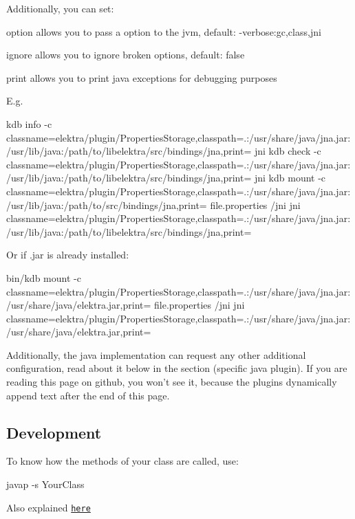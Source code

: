 Additionally, you can set\+:


\begin{DoxyItemize}
\item option allows you to pass a option to the jvm, default\+: -\/verbose\+:gc,class,jni
\item ignore allows you to ignore broken options, default\+: false
\item print allows you to print java exceptions for debugging purposes
\end{DoxyItemize}

E.\+g. \begin{DoxyVerb}kdb info -c classname=elektra/plugin/PropertiesStorage,classpath=.:/usr/share/java/jna.jar:/usr/lib/java:/path/to/libelektra/src/bindings/jna,print= jni
kdb check -c classname=elektra/plugin/PropertiesStorage,classpath=.:/usr/share/java/jna.jar:/usr/lib/java:/path/to/libelektra/src/bindings/jna,print= jni
kdb mount -c classname=elektra/plugin/PropertiesStorage,classpath=.:/usr/share/java/jna.jar:/usr/lib/java:/path/to/src/bindings/jna,print= file.properties /jni jni classname=elektra/plugin/PropertiesStorage,classpath=.:/usr/share/java/jna.jar:/usr/lib/java:/path/to/libelektra/src/bindings/jna,print=
\end{DoxyVerb}


Or if .jar is already installed\+: \begin{DoxyVerb}bin/kdb mount -c classname=elektra/plugin/PropertiesStorage,classpath=.:/usr/share/java/jna.jar:/usr/share/java/elektra.jar,print= file.properties /jni jni classname=elektra/plugin/PropertiesStorage,classpath=.:/usr/share/java/jna.jar:/usr/share/java/elektra.jar,print=
\end{DoxyVerb}


Additionally, the java implementation can request any other additional configuration, read about it below in the section (specific java plugin). If you are reading this page on github, you won't see it, because the plugins dynamically append text after the end of this page.

\subsection*{Development}

To know how the methods of your class are called, use\+: \begin{DoxyVerb}javap -s YourClass
\end{DoxyVerb}


Also explained \href{https://docs.oracle.com/javase/7/docs/technotes/guides/jni/spec/types.html#wp15773}{\tt here}

